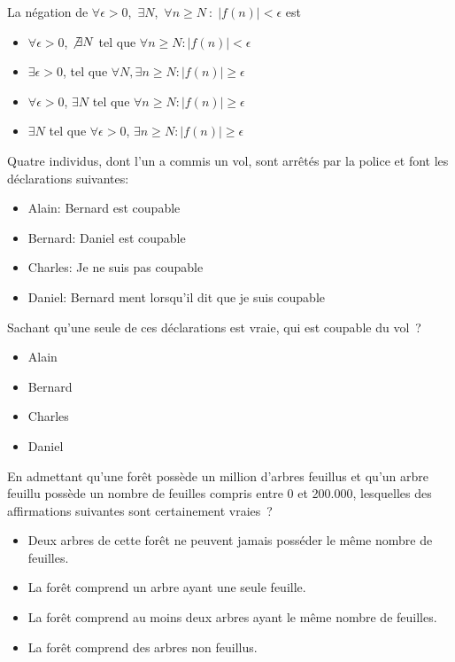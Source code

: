 \documentclass[12pt,french,oneside,a4paper]{memoir} %
\begin{document}
\begin{exo}
La négation de \qquad $\forall\epsilon >0$,\, $\exists N$,\,
$\forall n\geq N~:\; |f(n)|<\epsilon$ \qquad est

\begin{itemize}
\item $\forall\epsilon >0$, $\not\exists N$ tel que $\forall n\geq N: |f(n)|<\epsilon$
\item $\exists\epsilon >0$, tel que $\forall N, \exists n\geq N : |f(n)|\geq\epsilon$
\item $\forall\epsilon >0$, $\exists N$ tel que $\forall n\geq N : |f(n)|\geq\epsilon$
\item $\exists N$ tel que $\forall\epsilon >0$, $\exists n\geq N : |f(n)|\geq\epsilon$
\end{itemize}
\end{exo}

\begin{exo}
  Quatre individus, dont l'un a commis un vol, sont arrêtés par la police et font les déclarations suivantes:
  \begin{itemize}
  \item Alain: \og Bernard est coupable\fg{}
  \item Bernard: \og Daniel est coupable\fg{}
  \item Charles: \og Je ne suis pas coupable\fg{}
  \item Daniel: \og Bernard ment lorsqu'il dit que je suis coupable\fg{}
  \end{itemize}
  Sachant qu'une seule de ces déclarations est vraie, qui est coupable du vol~?

  \begin{itemize}
  \item Alain
  \item Bernard
  \item Charles
  \item Daniel
  \end{itemize}
\end{exo}

\begin{exo}
En admettant qu'une forêt possède un million d'arbres feuillus et
qu'un arbre feuillu possède un nombre de feuilles compris entre 0 et
200.000, lesquelles des affirmations suivantes sont certainement vraies~?

\begin{itemize}
\item Deux arbres de cette forêt ne peuvent jamais posséder le même
nombre de feuilles.
\item La forêt comprend un arbre ayant une seule feuille.
\item La forêt comprend au moins deux arbres ayant le même nombre de
feuilles. 
\item La forêt comprend des arbres non feuillus.
\end{itemize}
\end{exo}
\end{document}
